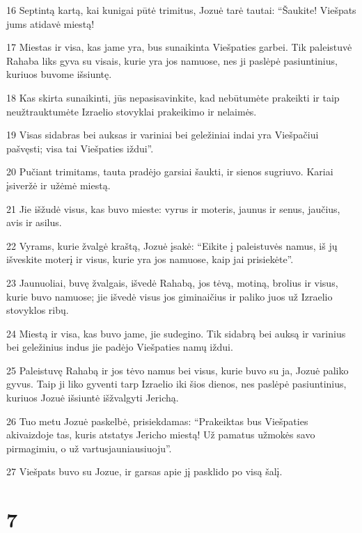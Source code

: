 \par 16 Septintą kartą, kai kunigai pūtė trimitus, Jozuė tarė tautai: “Šaukite! Viešpats jums atidavė miestą! 
\par 17 Miestas ir visa, kas jame yra, bus sunaikinta Viešpaties garbei. Tik paleistuvė Rahaba liks gyva su visais, kurie yra jos namuose, nes ji paslėpė pasiuntinius, kuriuos buvome išsiuntę. 
\par 18 Kas skirta sunaikinti, jūs nepasisavinkite, kad nebūtumėte prakeikti ir taip neužtrauktumėte Izraelio stovyklai prakeikimo ir nelaimės. 
\par 19 Visas sidabras bei auksas ir variniai bei geležiniai indai yra Viešpačiui pašvęsti; visa tai Viešpaties iždui”. 
\par 20 Pučiant trimitams, tauta pradėjo garsiai šaukti, ir sienos sugriuvo. Kariai įsiveržė ir užėmė miestą. 
\par 21 Jie išžudė visus, kas buvo mieste: vyrus ir moteris, jaunus ir senus, jaučius, avis ir asilus. 
\par 22 Vyrams, kurie žvalgė kraštą, Jozuė įsakė: “Eikite į paleistuvės namus, iš jų išveskite moterį ir visus, kurie yra jos namuose, kaip jai prisiekėte”. 
\par 23 Jaunuoliai, buvę žvalgais, išvedė Rahabą, jos tėvą, motiną, brolius ir visus, kurie buvo namuose; jie išvedė visus jos giminaičius ir paliko juos už Izraelio stovyklos ribų. 
\par 24 Miestą ir visa, kas buvo jame, jie sudegino. Tik sidabrą bei auksą ir varinius bei geležinius indus jie padėjo Viešpaties namų iždui. 
\par 25 Paleistuvę Rahabą ir jos tėvo namus bei visus, kurie buvo su ja, Jozuė paliko gyvus. Taip ji liko gyventi tarp Izraelio iki šios dienos, nes paslėpė pasiuntinius, kuriuos Jozuė išsiuntė išžvalgyti Jerichą. 
\par 26 Tuo metu Jozuė paskelbė, prisiekdamas: “Prakeiktas bus Viešpaties akivaizdoje tas, kuris atstatys Jericho miestą! Už pamatus užmokės savo pirmagimiu, o už vartus­jauniausiuoju”. 
\par 27 Viešpats buvo su Jozue, ir garsas apie jį pasklido po visą šalį.



\chapter{7}

